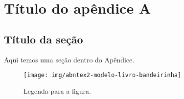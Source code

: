 \chapter{Título do apêndice A}\label{apendiceA}

\lipsum[50]

\section{Título da seção}

Aqui temos uma seção dentro do Apêndice.

\begin{figure}
    \begin{center}
        \texttt{[image: img/abntex2-modelo-livro-bandeirinha]}
        \caption{Legenda para a figura.}
        \label{rotulo1}
    \end{center}
\end{figure}